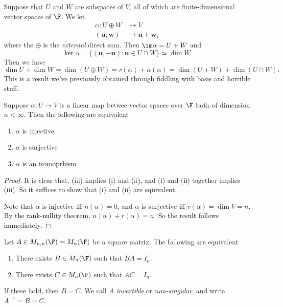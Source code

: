 \documentclass[a4paper]{article}
\begin{document}
\begin{eg}
  Suppose that $U$ and $W$ are subspaces of $V$, all of which are finite-dimensional vector spaces of $\F$. We let
  \begin{align*}
    \alpha: U\oplus W &\to V\\
    (\mathbf{u}, \mathbf{w}) &\mapsto \mathbf{u} + \mathbf{w},
  \end{align*}
  where the $\oplus$ is the \emph{external} direct sum. Then $\im \alpha =U + W$ and
  \[
    \ker \alpha = \{(\mathbf{u}, -\mathbf{u}): \mathbf{u}\in U\cap W\} \simeq \dim W.
  \]
  Then we have
  \[
    \dim U + \dim W = \dim (U\oplus W) = r(\alpha) + n(\alpha) = \dim(U + W) + \dim (U\cap W).
  \]
  This is a result we've previously obtained through fiddling with basis and horrible stuff.
\end{eg}

\begin{cor}
  Suppose $\alpha: U\to V$ is a linear map betwee vector spaces over $\F$ both of dimension $n < \infty$. Then the following are equivalent
  \begin{enumerate}
    \item $\alpha$ is injective
    \item $\alpha$ is surjective
    \item $\alpha$ is an isomoprhism
  \end{enumerate}
\end{cor}

\begin{proof}
  It is clear that, (iii) implies (i) and (ii), and (i) and (ii) together implies (iii). So it suffices to show that (i) and (ii) are equivalent.

  Note that $\alpha$ is injective iff $n(\alpha) = 0$, and $\alpha$ is surjective iff $r(\alpha) = \dim V = n$. By the rank-nullity theorem, $n(\alpha) + r(\alpha) = n$. So the result follows immediately.
\end{proof}

\begin{lemma}
  Let $A \in M_{n, n}(\F) = M_n(\F)$ be a square matrix. The following are equivalent
  \begin{enumerate}
    \item There exists $B\in M_n (\F)$ such that $BA = I_n$.
    \item There exists $C\in M_n (\F)$ such that $AC = I_n$.
  \end{enumerate}
  If these hold, then $B = C$. We call $A$ \emph{invertible} or \emph{non-singular}, and write $A^{-1} = B = C$.
\end{lemma}
\end{document}
